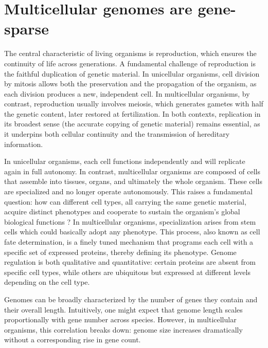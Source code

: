 \documentclass[11pt]{book}
\begin{document}
\section{Multicellular genomes are gene-sparse}
The central characteristic of living organisms is reproduction, which ensures the continuity of life across generations. A fundamental challenge of reproduction is the faithful duplication of genetic material. In unicellular organisms, cell division by mitosis allows both the preservation and the propagation of the organism, as each division produces a new, independent cell. In multicellular organisms, by contrast, reproduction usually involves meiosis, which generates gametes with half the genetic content, later restored at fertilization. In both contexts, replication in its broadest sense (the accurate copying of genetic material) remains essential, as it underpins both cellular continuity and the transmission of hereditary information.

In unicellular organisms, each cell functions independently and will replicate again in full autonomy. In contrast, multicellular organisms are composed of cells that assemble into tissues, organs, and ultimately the whole organism. These cells are specialized and no longer operate autonomously. This raises a fundamental question: how can different cell types, all carrying the same genetic material, acquire distinct phenotypes and cooperate to sustain the organism’s global biological functions ?
In multicellular organisms, specialization arises from stem cells which could basically adopt any phenotype. This process, also known as cell fate determination, is a finely tuned mechanism that programs each cell with a specific set of expressed proteins, thereby defining its phenotype. Genome regulation is both qualitative and quantitative: certain proteins are absent from specific cell types, while others are ubiquitous but expressed at different levels depending on the cell type.

Genomes can be broadly characterized by the number of genes they contain and their overall length. Intuitively, one might expect that genome length scales proportionally with gene number across species. However, in multicellular organisms, this correlation breaks down: genome size increases dramatically without a corresponding rise in gene count.
\end{document}

